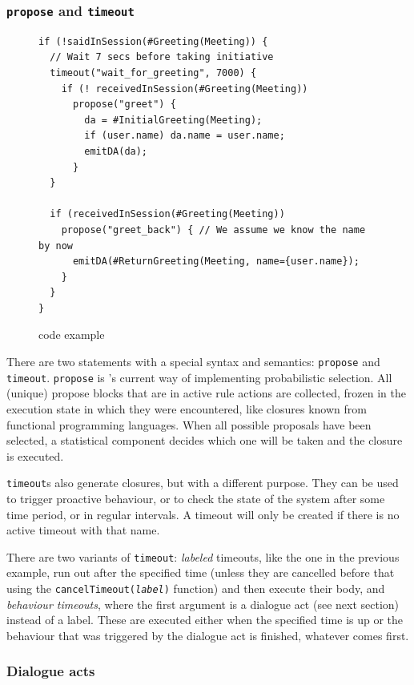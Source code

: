 \subsubsection{\texttt{propose} and \texttt{timeout}}
\begin{figure}[htbp]
  \centering\small%
\begin{lstlisting}
if (!saidInSession(#Greeting(Meeting)) {
  // Wait 7 secs before taking initiative
  timeout("wait_for_greeting", 7000) {
    if (! receivedInSession(#Greeting(Meeting))
      propose("greet") {
        da = #InitialGreeting(Meeting);
        if (user.name) da.name = user.name;
        emitDA(da);
      }
  }

  if (receivedInSession(#Greeting(Meeting))
    propose("greet_back") { // We assume we know the name by now
      emitDA(#ReturnGreeting(Meeting, name={user.name});
    }
  }
}
\end{lstlisting}\vspace*{-3ex}
  \caption{\vonda code example}
  \label{fig:propose}
\end{figure}

There are two statements with a special syntax and semantics: \texttt{propose}
and \texttt{timeout}. \texttt{propose} is \vonda's current way of implementing
probabilistic selection. All (unique) propose blocks that are in active rule
actions are collected, frozen in the execution state in which they were
encountered, like closures known from functional programming languages. When
all possible proposals have been selected, a statistical component decides
which one will be taken and the closure is executed.

\texttt{timeout}s also generate closures, but with a different purpose. They
can be used to trigger proactive behaviour, or to check the state of the system
after some time period, or in regular intervals. A timeout will only be created
if there is no active timeout with that name.

There are two variants of \texttt{timeout}: \emph{labeled} timeouts, like the
one in the previous example, run out after the specified time (unless they are
cancelled before that using the \texttt{cancelTimeout(\emph{label})} function)
and then execute their body, and \emph{behaviour timeouts}, where the first
argument is a dialogue act (see next section) instead of a label. These are
executed either when the specified time is up or the behaviour that was
triggered by the dialogue act is finished, whatever comes first.

\subsubsection{Dialogue acts}
\label{sec:caret}

